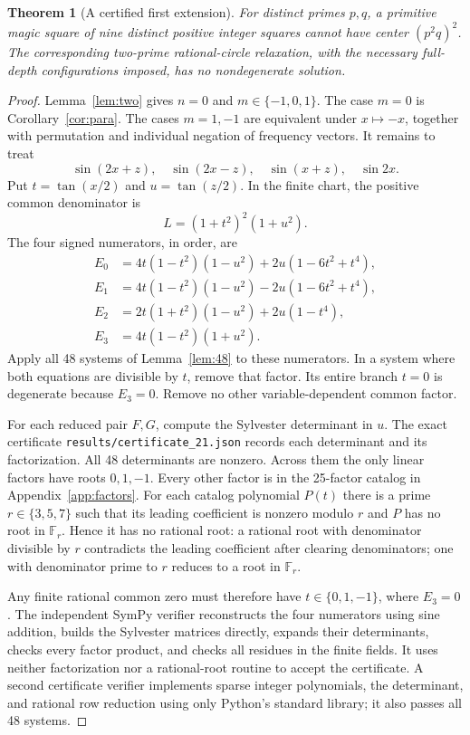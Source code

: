 \documentclass[11pt]{article}
\newtheorem{theorem}{Theorem}[section]
\theoremstyle{definition}\newtheorem{definition}[theorem]{Definition}
\theoremstyle{remark}\newtheorem{remark}[theorem]{Remark}
\begin{document}
\begin{theorem}[A certified first extension]\label{thm:21}
For distinct primes $p,q$, a primitive magic square of nine distinct positive integer squares cannot have center $(p^2q)^2$. The corresponding two-prime rational-circle relaxation, with the necessary full-depth configurations imposed, has no nondegenerate solution.
\end{theorem}
\begin{proof}
Lemma~\ref{lem:two} gives $n=0$ and $m\in\{-1,0,1\}$. The case $m=0$ is Corollary~\ref{cor:para}. The cases $m=1,-1$ are equivalent under $x\mapsto-x$, together with permutation and individual negation of frequency vectors. It remains to treat
\begin{equation}\label{eq:freq21}
\sin(2x+z),\quad \sin(2x-z),\quad\sin(x+z),\quad\sin2x.
\end{equation}
Put $t=\tan(x/2)$ and $u=\tan(z/2)$. In the finite chart, the positive common denominator is
\[
L=(1+t^2)^2(1+u^2).
\]
The four signed numerators, in order, are
\begin{align*}
E_0&=4t(1-t^2)(1-u^2)+2u(1-6t^2+t^4),\\
E_1&=4t(1-t^2)(1-u^2)-2u(1-6t^2+t^4),\\
E_2&=2t(1+t^2)(1-u^2)+2u(1-t^4),\\
E_3&=4t(1-t^2)(1+u^2).
\end{align*}
Apply all 48 systems of Lemma~\ref{lem:48} to these numerators. In a system where both equations are divisible by $t$, remove that factor. Its entire branch $t=0$ is degenerate because $E_3=0$. Remove no other variable-dependent common factor.

For each reduced pair $F,G$, compute the Sylvester determinant in $u$. The exact certificate \texttt{results/certificate\_21.json} records each determinant and its factorization. All 48 determinants are nonzero. Across them the only linear factors have roots $0,1,-1$. Every other factor is in the 25-factor catalog in Appendix~\ref{app:factors}. For each catalog polynomial $P(t)$ there is a prime $r\in\{3,5,7\}$ such that its leading coefficient is nonzero modulo $r$ and $P$ has no root in $\mathbb F_r$. Hence it has no rational root: a rational root with denominator divisible by $r$ contradicts the leading coefficient after clearing denominators; one with denominator prime to $r$ reduces to a root in $\mathbb F_r$.

Any finite rational common zero must therefore have $t\in\{0,1,-1\}$, where $E_3=0$. The independent SymPy verifier reconstructs the four numerators using sine addition, builds the Sylvester matrices directly, expands their determinants, checks every factor product, and checks all residues in the finite fields. It uses neither factorization nor a rational-root routine to accept the certificate. A second certificate verifier implements sparse integer polynomials, the determinant, and rational row reduction using only Python's standard library; it also passes all 48 systems.


\end{proof}
\end{document}
